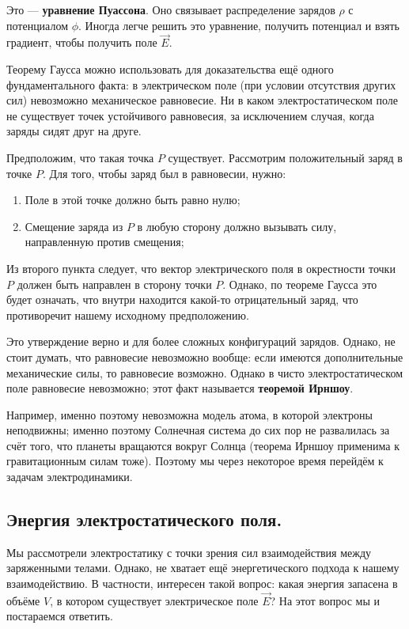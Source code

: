 \documentclass[12pt,a4paper]{article}
\numberwithin{equation}{section}
\numberwithin{equation}{section}
\begin{document}
Это --- \textbf{уравнение Пуассона}. Оно связывает распределение
зарядов $\rho$ с потенциалом $\phi$. Иногда легче решить это
уравнение, получить потенциал и взять градиент, чтобы получить поле
$\vec{E}$. 

Теорему Гаусса можно использовать для доказательства ещё одного
фундаментального факта: в электрическом поле (при условии отсутствия
других сил) невозможно механическое равновесие. Ни в каком
электростатическом поле не существует точек устойчивого равновесия, за
исключением случая, когда заряды сидят друг на друге. 

Предположим, что такая точка $P$ существует. Рассмотрим положительный
заряд в точке $P$. Для того, чтобы заряд был в равновесии, нужно:

\begin{enumerate}
\item Поле в этой точке должно быть равно нулю;
\item Смещение заряда из $P$ в любую сторону должно вызывать силу,
  направленную против смещения;
\end{enumerate}

Из второго пункта следует, что вектор электрического поля в 
окрестности точки $P$ должен быть направлен в сторону точки
$P$. Однако, по теореме Гаусса это будет означать, что внутри
находится какой-то отрицательный заряд, что противоречит нашему
исходному предположению. 

Это утверждение верно и для более сложных конфигураций
зарядов. Однако, не стоит думать, что равновесие невозможно вообще:
если имеются дополнительные механические силы, то равновесие
возможно. Однако в чисто электростатическом поле равновесие
невозможно; этот факт называется \textbf{теоремой Ирншоу}. 

Например, именно поэтому невозможна модель атома, в которой электроны
неподвижны; именно поэтому Солнечная система до сих пор не развалилась
за счёт того, что планеты вращаются вокруг Солнца (теорема Ирншоу
применима к гравитационным силам тоже). Поэтому мы через некоторое
время перейдём к задачам электродинамики. 

\subsection{Энергия электростатического поля.}
\label{sec:statics_energy}

Мы рассмотрели электростатику с точки зрения сил взаимодействия между
заряженными телами. Однако, не хватает ещё энергетического подхода к
нашему взаимодействию. В частности, интересен такой вопрос: какая
энергия запасена в объёме $V$, в котором существует электрическое поле
$\vec{E}$? На этот вопрос мы и постараемся ответить.
\end{document}

